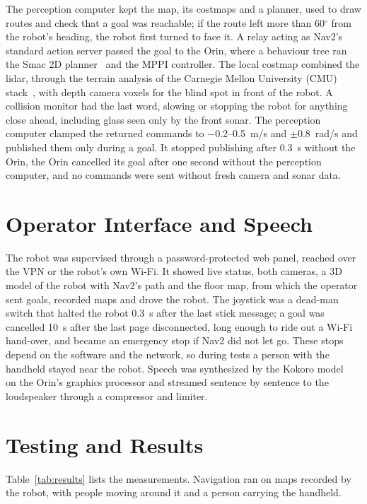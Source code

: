 \documentclass[11pt,a4paper]{article}
\begin{document}
The perception computer kept the map, its costmaps and a planner, used to draw routes and check that a
goal was reachable; if the route left more than 60$^\circ$ from the robot's heading, the robot first
turned to face it. A relay acting as Nav2's standard action server passed the goal to the Orin, where a
behaviour tree ran the Smac 2D planner~\cite{smac} and the MPPI controller. The local costmap combined
the lidar, through the terrain analysis of the Carnegie Mellon University (CMU) stack~\cite{cmu}, with
depth camera voxels for the blind spot in front of the robot. A collision monitor had the last word,
slowing or stopping the robot for anything close ahead, including glass seen only by the front sonar.
The perception computer clamped the returned commands to $-0.2$--0.5~m/s and $\pm$0.8~rad/s and
published them only during a goal. It stopped publishing after 0.3~s without the Orin, the Orin cancelled
its goal after one second without the perception computer, and no commands were sent without fresh
camera and sonar data.

\section{Operator Interface and Speech}

The robot was supervised through a password-protected web panel, reached over the VPN or the robot's own
Wi-Fi. It showed live status, both cameras, a 3D model of the robot with Nav2's path and the floor map, from
which the operator sent goals, recorded maps and drove the robot. The
joystick was a dead-man switch that halted the robot 0.3~s after the last stick message; a goal was
cancelled 10~s after the last page disconnected, long enough to ride out a Wi-Fi hand-over, and became an
emergency stop if Nav2 did not let go. These stops depend on the software and the network, so during
tests a person with the handheld stayed near the robot. Speech was synthesized by the Kokoro
model~\cite{kokoro} on the Orin's graphics processor and streamed sentence by sentence to the loudspeaker through a compressor and limiter.

\section{Testing and Results}

Table~\ref{tab:results} lists the measurements. Navigation ran on maps recorded by the robot, with
people moving around it and a person carrying the handheld.
\end{document}
